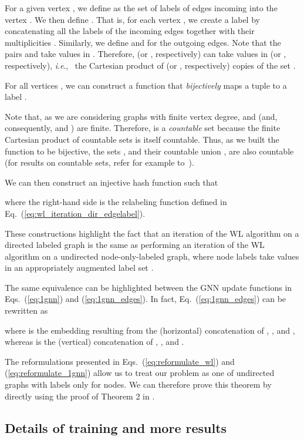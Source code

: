 \documentclass{article} \usepackage{iclr2019_conference,times}
\newcommand{\ie}{\textit{i}.\textit{e}., }
\begin{document}
For a given vertex , we define  as the set of labels of edges incoming into the vertex . We then define . That is, for each vertex , we create a label by concatenating all the labels of the incoming edges together with their multiplicities . Similarly, we define  and  for the outgoing edges. Note that the pairs  and  take values in . Therefore,  (or , respectively) can take values in  (or , respectively), \ie~the Cartesian product of  (or , respectively) copies of the set .

For all vertices , we can construct a function  that \emph{bijectively} maps a tuple  to a label . 

Note that, as we are considering graphs with finite vertex degree,  and  (and, consequently,  and ) are finite. Therefore,  is a \emph{countable} set because the finite Cartesian product of countable sets is itself countable. Thus, as we built the function  to be bijective, the sets , and their countable union , are also countable (for results on countable sets, refer for example to~\cite{Patterson1967}).

We can then construct an injective hash function  such that 

where the right-hand side is the relabeling function defined in Eq.~(\ref{eq:wl_iteration_dir_edgelabel}). 

These constructions highlight the fact that an iteration of the WL algorithm on a directed labeled graph is the same as performing an iteration of the WL algorithm on a undirected node-only-labeled graph, where node labels take values in an appropriately augmented label set .

The same equivalence can be highlighted between the GNN update functions in Eqs.~(\ref{eq:1gnn}) and (\ref{eq:1gnn_edges}). In fact, Eq.~(\ref{eq:1gnn_edges}) can be rewritten as 


where  is the embedding resulting from the (horizontal) concatenation of , , and , whereas  is the (vertical) concatenation of , , and .

The reformulations presented in Eqs.~(\ref{eq:reformulate_wl}) and  (\ref{eq:reformulate_1gnn}) allow us to treat our problem as one of undirected graphs with labels only for nodes. We can therefore prove this theorem by directly using the proof of Theorem 2 in \cite{Morris2018}. 

\subsection{Details of training and more results}
\end{document}
